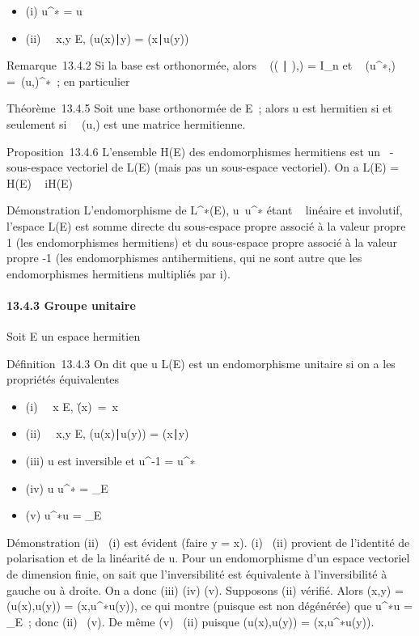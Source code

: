 \documentclass[]{article}
\begin{document}
\begin{itemize}
\itemsep1pt\parskip0pt
\item
  (i) u^∗ = u
\item
  (ii) \forall~~x,y \in E,
  (u(x)∣y) =
  (x∣u(y))
\end{itemize}

Remarque~13.4.2 Si la base  est orthonormée, alors
\mathrmMat~ ((
∣ ),) = I_n et
\mathrmMat~
(u^∗,) =\
\mathrmMat (u,)^∗~; en particulier

Théorème~13.4.5 Soit  une base orthonormée de E~; alors u est hermitien
si et seulement
si~\mathrmMat~ (u,) est une
matrice hermitienne.

Proposition~13.4.6 L'ensemble H(E) des endomorphismes hermitiens est un
\mathbb{R}~-sous-espace vectoriel de L(E) (mais pas un \mathbb{C} sous-espace vectoriel).
On a L(E) = H(E) \oplus~ iH(E)

Démonstration L'endomorphisme de L^∗(E),
u\mapsto~u^∗ étant ~ linéaire et
involutif, l'espace L(E) est somme directe du sous-espace propre associé
à la valeur propre 1 (les endomorphismes hermitiens) et du sous-espace
propre associé à la valeur propre -1 (les endomorphismes antihermitiens,
qui ne sont autre que les endomorphismes hermitiens multipliés par i).

\paragraph{13.4.3 Groupe unitaire}

Soit E un espace hermitien

Définition~13.4.3 On dit que u \in L(E) est un endomorphisme unitaire si
on a les propriétés équivalentes

\begin{itemize}
\itemsep1pt\parskip0pt
\item
  (i) \forall~~x \in E,
  \u(x)\
  =\ x\
\item
  (ii) \forall~~x,y \in E,
  (u(x)∣u(y)) =
  (x∣y)
\item
  (iii) u est inversible et u^-1 = u^∗
\item
  (iv) u \cdot u^∗ = \mathrmId_E
\item
  (v) u^∗\cdot u = \mathrmId_E
\end{itemize}

Démonstration (ii) \rigtharrow~(i) est évident (faire y = x). (i) \rigtharrow~(ii) provient de
l'identité de polarisation et de la linéarité de u. Pour un
endomorphisme d'un espace vectoriel de dimension finie, on sait que
l'inversibilité est équivalente à l'inversibilité à gauche ou à droite.
On a donc (iii) \Leftrightarrow (iv)
\Leftrightarrow (v). Supposons (ii) vérifié. Alors \phi(x,y) =
\phi(u(x),u(y)) = \phi(x,u^∗\cdot u(y)), ce qui montre (puisque \phi est
non dégénérée) que u^∗\cdot u =
\mathrmId_E~; donc (ii) \rigtharrow~(v). De même (v)
\rigtharrow~(ii) puisque \phi(u(x),u(y)) = \phi(x,u^∗\cdot u(y)).
\end{document}
